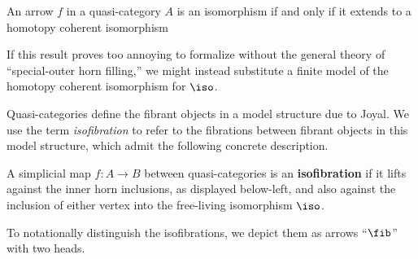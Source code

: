    \begin{proposition}\label{prop:coherent-iso}
    An arrow $f$ in a quasi-category $A$ is an isomorphism if and only if it extends to a homotopy coherent isomorphism
   \begin{center}
   \end{center}
   \end{proposition}

\begin{rmk}
If this result proves too annoying to formalize without the general theory of ``special-outer horn filling,'' we might instead substitute a finite model of the homotopy coherent isomorphism for $\iso$.
\end{rmk}



Quasi-categories define the fibrant objects in a model structure due to Joyal. We use the term \emph{isofibration} to refer to the fibrations between fibrant objects in this model structure, which admit the following concrete description.

\begin{definition}[isofibration]\label{defn:qcat-isofibration}
  \leanok
  A simplicial map $f \colon A \to B$ between quasi-categories is an \textbf{isofibration} if it lifts against the inner horn inclusions, as displayed below-left, and also against the inclusion of either vertex into the free-living isomorphism $\iso$.
  \begin{center}
  \end{center}
  To notationally distinguish the isofibrations, we depict them as arrows ``$\fib$'' with two heads.
\end{definition}

